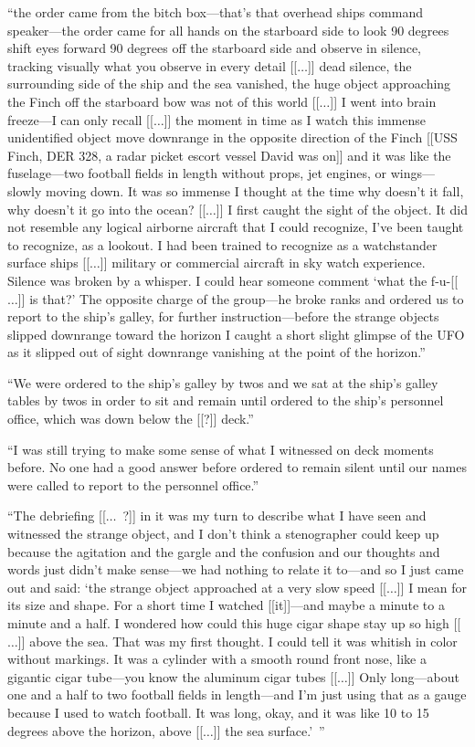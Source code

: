 \begin{svgraybox}
``the order came from the bitch  box---that's that overhead ships command speaker---the order came for all hands on the starboard side to
look 90 degrees shift eyes forward 90 degrees off the starboard side and observe in silence, tracking visually what you observe in every detail
[[$\ldots$]]
dead silence, the surrounding side of the ship and the sea vanished, the huge object approaching the Finch off the starboard bow was not of this
world [[$\ldots$]] I went into brain freeze---I can only recall [[$\ldots$]] the moment in time
as I watch this immense unidentified object move downrange in the opposite direction of the Finch
[[USS Finch, DER 328, a radar picket escort vessel David was on]]
and it was like the fuselage---two football fields in length without props, jet engines, or wings---slowly moving down.
It was so immense I thought at the time why doesn't it fall, why doesn't it go
into the ocean?
[[$\ldots$]]
I first caught the sight of the object. It did not resemble any logical airborne aircraft
that I could recognize, I've been taught to recognize, as a lookout.
I had been trained to recognize as a watchstander surface ships
[[$\ldots$]] military or commercial aircraft in sky watch experience.
Silence was broken by a whisper.
I could hear someone comment `what the  f-u-[[$\ldots$]] is that?'
The opposite charge of the group---he broke ranks and ordered us to report to the ship's galley,
for further instruction---before the strange objects slipped downrange toward the horizon
I caught a short slight glimpse of the UFO as it slipped out of sight
downrange vanishing at the point of the horizon.''


``We were ordered to
the ship's galley by twos and we sat at the ship's galley tables by twos in order to sit and remain until ordered to the
ship's personnel office, which was down below the [[?]] deck.''

``I was still trying to make some sense of what I witnessed on deck moments before. No one had a good answer before ordered
to remain silent until our names were called to report to the personnel office.''

``The debriefing [[$\ldots$~?]] in it was my turn to describe what I have seen and witnessed the strange object,
 and I don't think a stenographer could keep up because the agitation and the gargle
and the confusion and our thoughts and words just didn't make sense---we had nothing to relate it to---and
so I just came out and said:
`the strange object approached at a very slow speed [[$\ldots$]] I mean for its size and shape.
For a short time I watched [[it]]---and maybe
a minute to a minute and a half.
I wondered how could this huge cigar shape stay up so high [[$\ldots$]] above the sea.
That was my first thought. I could tell it was whitish in color without markings.
It was a cylinder with a smooth round front nose,
like a gigantic cigar tube---you know the aluminum cigar tubes [[$\ldots$]]
Only long---about one and a half to two football fields in length---and I'm just using that as a gauge because I used to watch football.
It was long, okay, and it was like 10 to 15 degrees above the horizon, above [[$\ldots$]]  the sea surface.'~''
\end{svgraybox}


